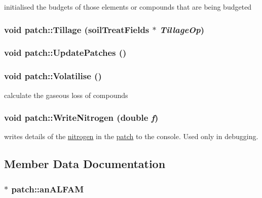 initialised the budgets of those elements or compounds that are being budgeted \hypertarget{classpatch_a8e0f4140df73da5dadd9a4aca8a7a7ee}{
\subsubsection[{Tillage}]{\setlength{\rightskip}{0pt plus 5cm}void patch::Tillage ({\bf soilTreatFields} $\ast$ {\em TillageOp})}}
\label{classpatch_a8e0f4140df73da5dadd9a4aca8a7a7ee}
\hypertarget{classpatch_a6e23eb42dae4af96e728568fc35ac256}{
\subsubsection[{UpdatePatches}]{\setlength{\rightskip}{0pt plus 5cm}void patch::UpdatePatches ()}}
\label{classpatch_a6e23eb42dae4af96e728568fc35ac256}
\hypertarget{classpatch_a0fdda2c18cd319101078a5de170f19cb}{
\subsubsection[{Volatilise}]{\setlength{\rightskip}{0pt plus 5cm}void patch::Volatilise ()}}
\label{classpatch_a0fdda2c18cd319101078a5de170f19cb}


calculate the gaseous loss of compounds \hypertarget{classpatch_adee8003561555e32b46f06fff7d5381b}{
\subsubsection[{WriteNitrogen}]{\setlength{\rightskip}{0pt plus 5cm}void patch::WriteNitrogen (double {\em f})}}
\label{classpatch_adee8003561555e32b46f06fff7d5381b}


writes details of the \hyperlink{classnitrogen}{nitrogen} in the \hyperlink{classpatch}{patch} to the console. Used only in debugging. 

\subsection{Member Data Documentation}
\hypertarget{classpatch_ab5f7d71681c2f3a154051907c3d1cd3d}{
\subsubsection[{anALFAM}]{$\ast$ {\bf patch::anALFAM}}}
\label{classpatch_ab5f7d71681c2f3a154051907c3d1cd3d}


